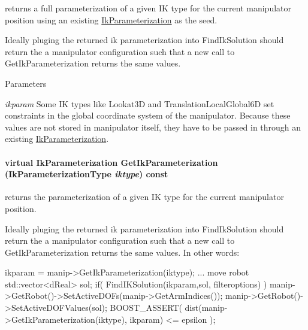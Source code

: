 returns a full parameterization of a given IK type for the current manipulator position using an existing \hyperlink{classOpenRAVE_1_1IkParameterization}{IkParameterization} as the seed. 

Ideally pluging the returned ik parameterization into FindIkSolution should return the a manipulator configuration such that a new call to GetIkParameterization returns the same values. 
\begin{DoxyParams}{Parameters}
\item[{\em ikparam}]Some IK types like Lookat3D and TranslationLocalGlobal6D set constraints in the global coordinate system of the manipulator. Because these values are not stored in manipulator itself, they have to be passed in through an existing \hyperlink{classOpenRAVE_1_1IkParameterization}{IkParameterization}. \end{DoxyParams}
\hypertarget{classOpenRAVE_1_1RobotBase_1_1Manipulator_af4452ae2258d7656aa374bc0530edc1f}{
\paragraph[{GetIkParameterization}]{\setlength{\rightskip}{0pt plus 5cm}virtual {\bf IkParameterization} GetIkParameterization ({\bf IkParameterizationType} {\em iktype}) const}\hfill}
\label{classOpenRAVE_1_1RobotBase_1_1Manipulator_af4452ae2258d7656aa374bc0530edc1f}


returns the parameterization of a given IK type for the current manipulator position. 

Ideally pluging the returned ik parameterization into FindIkSolution should return the a manipulator configuration such that a new call to GetIkParameterization returns the same values. In other words: 
\begin{DoxyCode}
            ikparam = manip->GetIkParameterization(iktype);
            ... move robot
            std::vector<dReal> sol;
            if( FindIKSolution(ikparam,sol, filteroptions) ) {
                manip->GetRobot()->SetActiveDOFs(manip->GetArmIndices());
                manip->GetRobot()->SetActiveDOFValues(sol);
                BOOST_ASSERT( dist(manip->GetIkParameterization(iktype), ikparam)
       <= epsilon );
            }
\end{DoxyCode}
 
